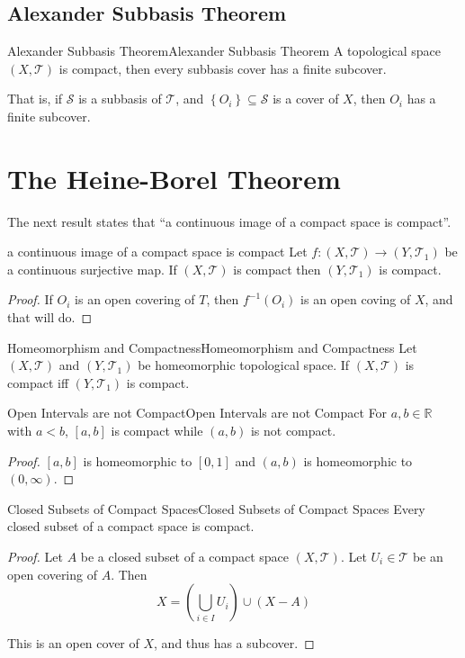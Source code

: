 \documentclass[../main.tex]{subfiles}
\begin{document}
\subsection{Alexander Subbasis Theorem}
\begin{theorem}{Alexander Subbasis Theorem}{Alexander Subbasis Theorem}
A topological space $(X,\mathcal{T})$ is compact, then every subbasis cover has a finite subcover.

That is, if $\mathcal{S}$ is a subbasis of $\mathcal{T}$, and $\left\{ O_i \right\} \subseteq \mathcal{S}$ is a cover of $X$, then $O_i$ has a finite subcover.
\end{theorem}

\section{The Heine-Borel Theorem}
The next result states that ``a continuous image of a compact space is compact''.

\begin{theorem}{}{a continuous image of a compact space is compact}
Let $f:(X,\mathcal{T}) \rightarrow (Y,\mathcal{T}_1)$ be a continuous surjective map. If $(X,\mathcal{T})$ is compact then $(Y,\mathcal{T}_1)$ is compact.
\end{theorem}
\begin{proof}
If $O_i$ is an open covering of $T$, then $f^{-1}(O_i)$ is an open coving of $X$, and that will do.
\end{proof}

\begin{corollary}{Homeomorphism and Compactness}{Homeomorphism and Compactness}
Let $(X,\mathcal{T})$ and $(Y,\mathcal{T}_1)$ be homeomorphic topological space. If $(X,\mathcal{T})$ is compact iff $(Y,\mathcal{T}_1)$ is compact.
\end{corollary}

\begin{corollary}{Open Intervals are not Compact}{Open Intervals are not Compact}
	For $a,b\in \mathbb{R}$ with $a < b$, $[a,b]$ is compact while $(a,b)$ is not compact.
\end{corollary}
\begin{proof}
	$[a,b]$ is homeomorphic to $[0,1]$ and $(a,b)$ is homeomorphic to $(0,\infty )$.
\end{proof}

\begin{theorem}{Closed Subsets of Compact Spaces}{Closed Subsets of Compact Spaces}
Every closed subset of a compact space is compact.
\end{theorem}
\begin{proof}
Let $A$ be a closed subset of a compact space $(X,\mathcal{T})$. Let $U_i\in \mathcal{T}$ be an open covering of $A$. Then
\begin{equation*}
X = \left(\bigcup_{i\in I} U_i\right) \cup (X-A)
\end{equation*}

This is an open cover of $X$, and thus has a subcover.
\end{proof}
\end{document}
